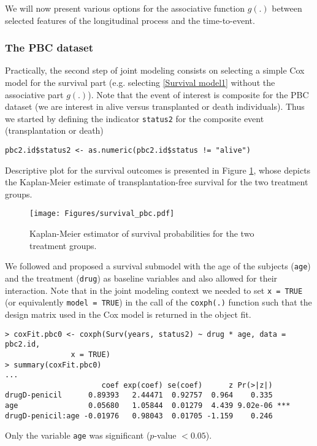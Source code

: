 \documentclass[12pt]{article}
\begin{document}
We will now present various options for the associative function $g(.)$ between selected features of the longitudinal process and the time-to-event.


\subsubsection{The PBC dataset}

Practically, the second step of joint modeling consists on selecting a simple Cox model for the survival part (e.g. selecting \eqref{Survival model1} without the associative part $g(.)$).
Note that the event of interest is composite for the PBC dataset (we are interest in alive versus transplanted or death individuals).
Thus we started by defining the indicator \texttt{status2} for the composite event (transplantation or death)
\begin{verbatim}
pbc2.id$status2 <- as.numeric(pbc2.id$status != "alive")
\end{verbatim}
Descriptive plot for the survival outcomes is presented in Figure \ref{KM_pbc}, whose depicts the Kaplan-Meier estimate of transplantation-free survival for the two treatment groups.
\begin{figure}[!tb]
\centering
\texttt{[image: Figures/survival\_pbc.pdf]}
\caption{Kaplan-Meier estimator of survival probabilities for the two treatment groups.}
\label{KM_pbc}
\end{figure}
We followed \cite{JMbayes} and proposed a survival submodel with the age of the subjects (\texttt{age}) and the treatment (\texttt{drug}) as baseline variables and also allowed for their interaction. Note that in the joint modeling context  we needed to set \texttt{x = TRUE} (or equivalently \texttt{model = TRUE}) in the call of the \texttt{coxph(.)} function such that the design matrix used in the Cox model is returned in the object fit.
\begin{verbatim}
> coxFit.pbc0 <- coxph(Surv(years, status2) ~ drug * age, data = pbc2.id,
			   x = TRUE)
> summary(coxFit.pbc0)
...
                      coef exp(coef) se(coef)      z Pr(>|z|)
drugD-penicil      0.89393   2.44471  0.92757  0.964    0.335
age                0.05680   1.05844  0.01279  4.439 9.02e-06 ***
drugD-penicil:age -0.01976   0.98043  0.01705 -1.159    0.246
\end{verbatim}
Only the variable \texttt{age} was significant ($p$-value $<0.05$).
\end{document}

